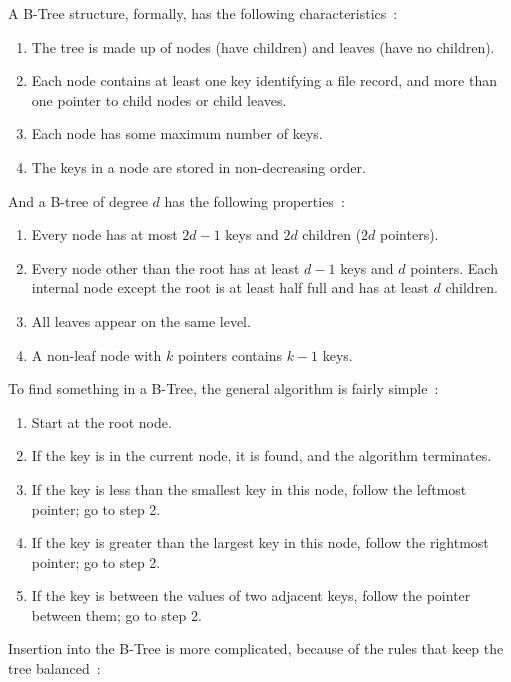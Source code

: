 A B-Tree structure, formally, has the following characteristics~\cite{osi}:

\begin{enumerate}
	\item The tree is made up of nodes (have children) and leaves (have no children).
	\item Each node contains at least one key identifying a file record, and more than one pointer to child nodes or child leaves.
	\item Each node has some maximum number of keys.
	\item The keys in a node are stored in non-decreasing order.
\end{enumerate}

And a B-tree of degree $d$ has the following properties~\cite{osi}:

\begin{enumerate}
	\item Every node has at most $2d-1$ keys and $2d$ children ($2d$ pointers).
	\item Every node other than the root has at least $d-1$ keys and $d$ pointers. Each internal node except the root is at least half full and has at least $d$ children.
	\item All leaves appear on the same level.
	\item A non-leaf node with $k$ pointers contains $k-1$ keys.
\end{enumerate}

To find something in a B-Tree, the general algorithm is fairly simple~\cite{osi}:

\begin{enumerate}
	\item Start at the root node. 
	\item If the key is in the current node, it is found, and the algorithm terminates.
	\item If the key is less than the smallest key in this node, follow the leftmost pointer; go to step 2.
	\item If the key is greater than the largest key in this node, follow the rightmost pointer; go to step 2.
	\item If the key is between the values of two adjacent keys, follow the pointer between them; go to step 2.
\end{enumerate}


Insertion into the B-Tree is more complicated, because of the rules that keep the tree balanced~\cite{osi}:

